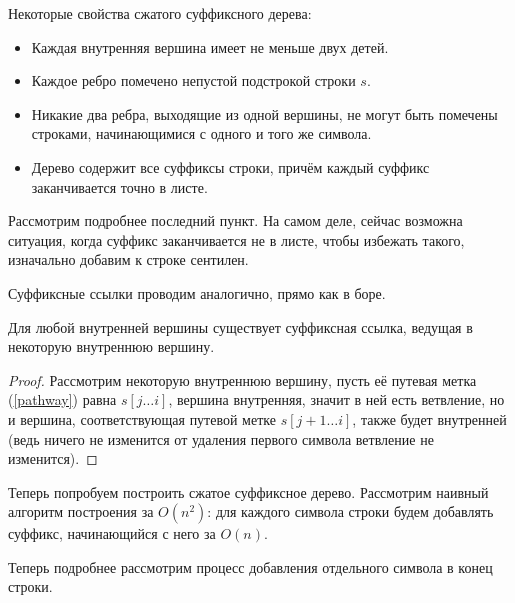 Некоторые свойства сжатого суффиксного дерева:
\begin{itemize}
  \item Каждая внутренняя вершина имеет не меньше двух детей.
  \item Каждое ребро помечено непустой подстрокой строки $s$.
  \item Никакие два ребра, выходящие из одной вершины, не могут быть помечены строками, начинающимися с
    одного и того же символа.
  \item Дерево содержит все суффиксы строки, причём каждый суффикс заканчивается точно в листе.
\end{itemize}

Рассмотрим подробнее последний пункт.
На самом деле, сейчас возможна ситуация, когда суффикс заканчивается не в листе, чтобы избежать такого, 
изначально добавим к строке сентилен.

Суффиксные ссылки проводим аналогично, прямо как в боре.
\begin{lemma}
  \label{4.1}
  Для любой внутренней вершины существует суффиксная ссылка, ведущая в некоторую внутреннюю вершину.
\end{lemma}
\begin{proof}
  Рассмотрим некоторую внутреннюю вершину, пусть её путевая метка (\ref{pathway}) 
  равна $s[j\ldots i]$, вершина
  внутренняя, значит в ней есть ветвление, но и вершина, соответствующая путевой метке $s[j + 1\ldots i]$,
  также будет внутренней (ведь ничего не изменится от удаления первого символа ветвление не изменится).
\end{proof}

Теперь попробуем построить сжатое суффиксное дерево. Рассмотрим наивный алгоритм построения
за $O(n^2)$: для каждого символа строки будем добавлять суффикс, начинающийся с него за $O(n)$.

Теперь подробнее рассмотрим процесс добавления отдельного символа в конец строки. 

